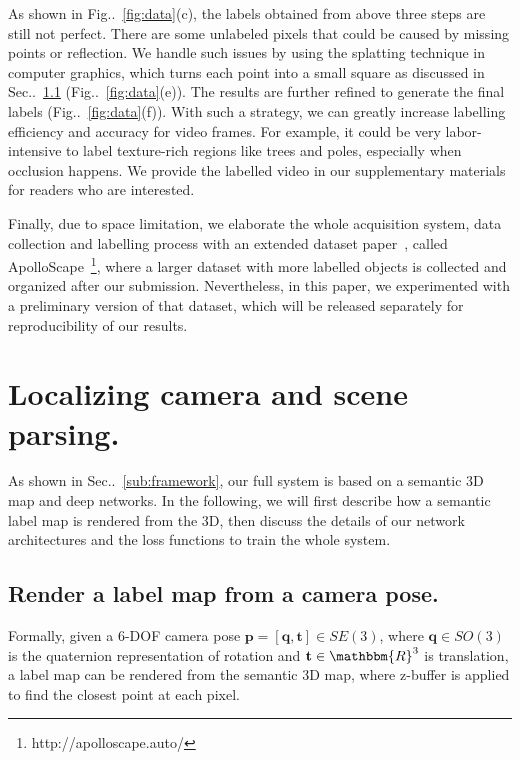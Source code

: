 \documentclass[10pt,twocolumn,letterpaper]{article}
\makeatletter
\newcommand{\figref}[1]{Fig\onedot~\ref{#1}}
\newcommand{\secref}[1]{Sec\onedot~\ref{#1}}
\newcommand{\ve}[1]{{\mathbf #1}} %
\DeclareRobustCommand\onedot{\futurelet\@let@token\@onedot}
\def\onedot{\ifx\@let@token.\else.\null\fi\xspace}
\makeatother
\begin{document}
As shown in \figref{fig:data}(c), the labels obtained from above three steps are still not perfect. There are some unlabeled pixels that could be caused by missing points or reflection. We handle such issues by using the splatting technique in computer graphics, which turns each point into a small square as discussed in \secref{sub:render} (\figref{fig:data}(e)). The results are further refined to generate the final labels (\figref{fig:data}(f)).
With such a strategy, we can greatly increase labelling efficiency and accuracy for video frames. For example, it could be very labor-intensive to label texture-rich regions like trees and poles, especially when occlusion happens. We provide the labelled video in our supplementary materials for readers who are interested. 

Finally, due to space limitation, we elaborate the whole acquisition system, data collection and labelling process with an extended dataset paper~\cite{huang2018cvprw}, called ApolloScape~\footnote{http://apolloscape.auto/}, where a larger dataset with more labelled objects is collected and organized after our submission. 
Nevertheless, in this paper, we experimented with a preliminary version of that dataset, which will be released separately for reproducibility of our results.


\vspace{-0.5\baselineskip}\section{Localizing camera and scene parsing.}\vspace{-0.3\baselineskip}\label{sec:localize_and_parsing}
As shown in \secref{sub:framework}, our full system is based on a semantic 3D map and deep networks. In the following, we will first describe how a semantic label map is rendered from the 3D, then discuss the details of our network architectures and the loss functions to train the whole system.

\subsection{Render a label map from a camera pose.}\label{sub:render}
Formally, given a 6-DOF camera pose $\ve{p} = [\ve{q}, \ve{t}] \in SE(3)$, where $\ve{q} \in SO(3)$ is the quaternion representation of rotation and $\ve{t} \in \mathbbm{R}^3$ is translation, a label map can be rendered from the semantic 3D map, where z-buffer is applied to find the closest point at each pixel.
\end{document}
